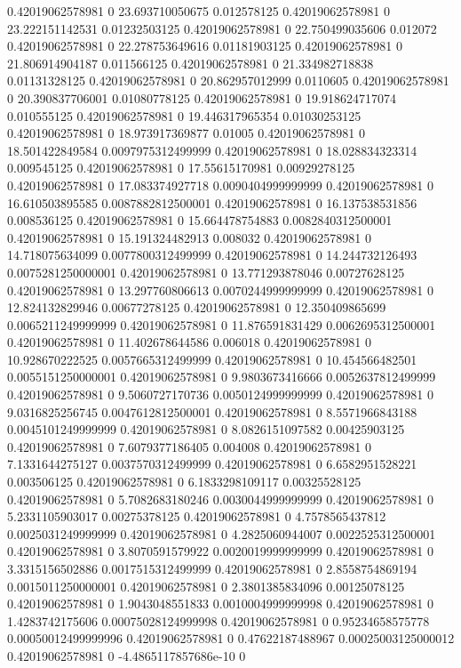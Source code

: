 0.42019062578981 0 23.693710050675 0.012578125
0.42019062578981 0 23.222151142531 0.01232503125
0.42019062578981 0 22.750499035606 0.012072
0.42019062578981 0 22.278753649616 0.01181903125
0.42019062578981 0 21.806914904187 0.011566125
0.42019062578981 0 21.334982718838 0.01131328125
0.42019062578981 0 20.862957012999 0.0110605
0.42019062578981 0 20.390837706001 0.01080778125
0.42019062578981 0 19.918624717074 0.010555125
0.42019062578981 0 19.446317965354 0.01030253125
0.42019062578981 0 18.973917369877 0.01005
0.42019062578981 0 18.501422849584 0.0097975312499999
0.42019062578981 0 18.028834323314 0.009545125
0.42019062578981 0 17.55615170981 0.00929278125
0.42019062578981 0 17.083374927718 0.0090404999999999
0.42019062578981 0 16.610503895585 0.0087882812500001
0.42019062578981 0 16.137538531856 0.008536125
0.42019062578981 0 15.664478754883 0.0082840312500001
0.42019062578981 0 15.191324482913 0.008032
0.42019062578981 0 14.718075634099 0.0077800312499999
0.42019062578981 0 14.244732126493 0.0075281250000001
0.42019062578981 0 13.771293878046 0.00727628125
0.42019062578981 0 13.297760806613 0.0070244999999999
0.42019062578981 0 12.824132829946 0.00677278125
0.42019062578981 0 12.350409865699 0.0065211249999999
0.42019062578981 0 11.876591831429 0.0062695312500001
0.42019062578981 0 11.402678644586 0.006018
0.42019062578981 0 10.928670222525 0.0057665312499999
0.42019062578981 0 10.454566482501 0.0055151250000001
0.42019062578981 0 9.9803673416666 0.0052637812499999
0.42019062578981 0 9.5060727170736 0.0050124999999999
0.42019062578981 0 9.0316825256745 0.0047612812500001
0.42019062578981 0 8.5571966843188 0.0045101249999999
0.42019062578981 0 8.0826151097582 0.00425903125
0.42019062578981 0 7.6079377186405 0.004008
0.42019062578981 0 7.1331644275127 0.0037570312499999
0.42019062578981 0 6.6582951528221 0.003506125
0.42019062578981 0 6.1833298109117 0.00325528125
0.42019062578981 0 5.7082683180246 0.0030044999999999
0.42019062578981 0 5.2331105903017 0.00275378125
0.42019062578981 0 4.7578565437812 0.0025031249999999
0.42019062578981 0 4.2825060944007 0.0022525312500001
0.42019062578981 0 3.8070591579922 0.0020019999999999
0.42019062578981 0 3.3315156502886 0.0017515312499999
0.42019062578981 0 2.8558754869194 0.0015011250000001
0.42019062578981 0 2.3801385834096 0.00125078125
0.42019062578981 0 1.9043048551833 0.0010004999999998
0.42019062578981 0 1.4283742175606 0.00075028124999998
0.42019062578981 0 0.95234658575778 0.00050012499999996
0.42019062578981 0 0.47622187488967 0.00025003125000012
0.42019062578981 0 -4.4865117857686e-10 0
